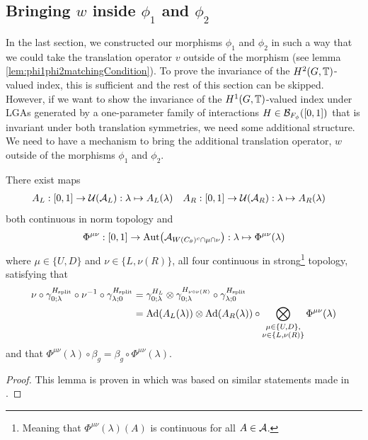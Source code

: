 \documentclass[11pt,a4paper,twoside]{article}
\def\version{1}
\newcommand{\versionDifference}[2]{\ifthenelse{\version=0}{#1}{#2}}
\numberwithin{equation}{section}
\begin{document}
	\subsection{Bringing \texorpdfstring{$w$}{} inside \texorpdfstring{$\phi_1$}{} and \texorpdfstring{$\phi_2$}{}}
	In the last section, we constructed our morphisms $\phi_1$ and $\phi_2$ in such a way that we could take the translation operator $v$ outside of the morphism (see lemma \ref{lem:phi1phi2matchingCondition}). To prove the invariance of the $H^2(G,\TT)$-valued index, this is sufficient and the rest of this section can be skipped. However, if we want to show the invariance of the $H^1(G,\TT)$-valued index under LGAs generated by a one-parameter family of interactions $H\in\BB_{F_\phi}([0,1])$ that is invariant under both translation symmetries, we need some additional structure. We need to have a mechanism to bring the additional translation operator, $w$ outside of the morphisms $\phi_1$ and $\phi_2$.
	\begin{lemma}\label{lem:TranslatingSplittedTimeEvolution}
		There exist maps
		\begin{align}
			A_L&:[0,1]\rightarrow \UU(\AA_L):\lambda\mapsto A_{L}(\lambda)&A_R&:[0,1]\rightarrow \UU(\AA_R):\lambda\mapsto A_{R}(\lambda)
		\end{align}
		both continuous in norm topology and
		\begin{align}
			\Phi^{\mu\nu}:[0,1]\rightarrow\Aut{\AA_{W(C_\theta)^c\cap\mu\cap\nu}}:\lambda\mapsto \Phi^{\mu\nu}(\lambda)
		\end{align}
		where $\mu\in\{U,D\}$ and $\nu\in\{L,\nu(R)\}$, all four continuous in strong\footnote{Meaning that $\Phi^{\mu\nu}(\lambda)(A)$ is continuous for all $A\in\AA$.} topology, satisfying that
		\begin{align}
			\nu\circ\gamma^{\Hsplit}_{0;\lambda}\circ\nu^{-1}\circ\gamma^{\Hsplit}_{\lambda;0}&=\gamma^{H_L}_{0;\lambda}\otimes\gamma^{H_{\nu\circ\nu(R)}}_{0;\lambda}\circ\gamma^{\Hsplit}_{\lambda;0}\\
			\label{eq:TranslatingSplittedTimeEvolution}
			&=\Ad{A_L(\lambda)}\otimes\Ad{A_R(\lambda)}\circ\bigotimes_{\substack{\mu\in\{U,D\},\\\nu\in\{L,\nu(R)\}}}\Phi^{\mu\nu}(\lambda)
		\end{align}
		and that $\Phi^{\mu\nu}(\lambda)\circ\beta_g=\beta_g\circ\Phi^{\mu\nu}(\lambda)$.
	\end{lemma}
	\begin{proof}
		This lemma is proven in \versionDifference{\ref{lem:SplittedAutomorphismAfterTranslatedIsVertical}}{C.8. of \cite{jappens2023spt}} which was based on similar statements made in \cite{ogata2021h3gmathbb}.
	\end{proof}
\end{document}
